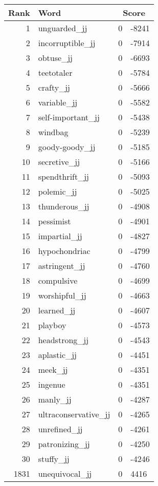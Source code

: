 \begin{longtable}[!htbp]{| rlr@{.}l |}
    \hline
    \textbf{Rank} & \textbf{Word} & \multicolumn{2}{c|}{\textbf{Score}} \\
    \hline
    \endhead
    1 & unguarded\_jj & 0 & -8241 \\
    2 & incorruptible\_jj & 0 & -7914 \\
    3 & obtuse\_jj & 0 & -6693 \\
    4 & teetotaler & 0 & -5784 \\
    5 & crafty\_jj & 0 & -5666 \\
    6 & variable\_jj & 0 & -5582 \\
    7 & self-important\_jj & 0 & -5438 \\
    8 & windbag & 0 & -5239 \\
    9 & goody-goody\_jj & 0 & -5185 \\
    10 & secretive\_jj & 0 & -5166 \\
    11 & spendthrift\_jj & 0 & -5093 \\
    12 & polemic\_jj & 0 & -5025 \\
    13 & thunderous\_jj & 0 & -4908 \\
    14 & pessimist & 0 & -4901 \\
    15 & impartial\_jj & 0 & -4827 \\
    16 & hypochondriac & 0 & -4799 \\
    17 & astringent\_jj & 0 & -4760 \\
    18 & compulsive & 0 & -4699 \\
    19 & worshipful\_jj & 0 & -4663 \\
    20 & learned\_jj & 0 & -4607 \\
    21 & playboy & 0 & -4573 \\
    22 & headstrong\_jj & 0 & -4543 \\
    23 & aplastic\_jj & 0 & -4451 \\
    24 & meek\_jj & 0 & -4351 \\
    25 & ingenue & 0 & -4351 \\
    26 & manly\_jj & 0 & -4287 \\
    27 & ultraconservative\_jj & 0 & -4265 \\
    28 & unrefined\_jj & 0 & -4261 \\
    29 & patronizing\_jj & 0 & -4250 \\
    30 & stuffy\_jj & 0 & -4246 \\
    1831 & unequivocal\_jj & 0 & 4416 \\

\end{longtable}
